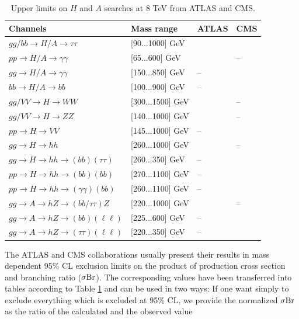 \documentclass[preprint,3p,12pt]{elsarticle}
\begin{document}
\begin{table}[tb]
 \centering
 \caption{Upper limits on $H$ and $A$ searches at 8 TeV from ATLAS and CMS.}\vspace{0.2cm}
  \begin{tabular}{|l|l|l|l|}
    \hline
      Channels & Mass range & ATLAS & CMS\\
    \hline
      $gg/bb \to H/A \to \tau \tau $ & [90...1000] GeV & \cite{Aad:2014vgg} & \cite{CMS:2015mca} \\
    \hline
      $pp\to H/A \to \gamma \gamma $ & [65...600] GeV & \cite{Aad:2014ioa} & --\\
    \hline
      $gg\to H/A \to \gamma \gamma $ & [150...850] GeV & -- & \cite{Khachatryan:2015qba}\\
    \hline
      $bb\to H/A \to bb$ & [100...900] GeV &  -- & \cite{Khachatryan:2015tra}\\
    \hline
      $gg/VV \to H\to WW$ & [300...1500] GeV & \cite{Aad:2015agg} & --\\
    \hline
      $gg/VV \to H\to ZZ$ & [140...1000] GeV & \cite{Aad:2015kna} & --\\
    \hline
      $pp\to H\to VV$ & [145...1000] GeV & -- & \cite{Khachatryan:2015cwa}\\
    \hline
      $gg\to H\to hh$ & [260...1000] GeV & \cite{Aad:2015xja} & --\\
    \hline
      $gg\to H\to hh\to (bb)(\tau \tau )$ & [260...350] GeV & -- & \cite{Khachatryan:2015tha}\\
    \hline
      $pp\to H\to hh\to (bb)(bb)$ & [270...1100] GeV & -- & \cite{Khachatryan:2015yea}\\
    \hline
      $pp\to H\to hh\to (\gamma \gamma )(bb)$ & [260...1100] GeV & -- & \cite{CMS:2014ipa}\\
    \hline
      $gg\to A\to hZ\to (bb/\tau \tau )Z$ & [220...1000] GeV & \cite{Aad:2015wra} & --\\
    \hline
      $gg\to A\to hZ\to (bb)(\ell \ell )$ & [225...600] GeV & -- & \cite{Khachatryan:2015lba}\\
    \hline
      $gg\to A\to hZ\to (\tau \tau )(\ell \ell )$ & [220...350] GeV & -- & \cite{Khachatryan:2015tha}\\
    \hline
  \end{tabular}
 \label{tab:HandAsearchlimits}
\end{table} 

The ATLAS and CMS collaborations usually present their results in mass dependent 95\% CL exclusion limits on the product of production cross section and branching ratio ($\sigma {\rm Br}$). The corresponding values have been transferred into tables according to Table \ref{tab:HandAsearchlimits} and can be used in two ways:
If one want simply to exclude everything which is excluded at 95\% CL, we provide the normalized $\sigma {\rm Br}$ as the ratio of the calculated and the observed value
\end{document}
